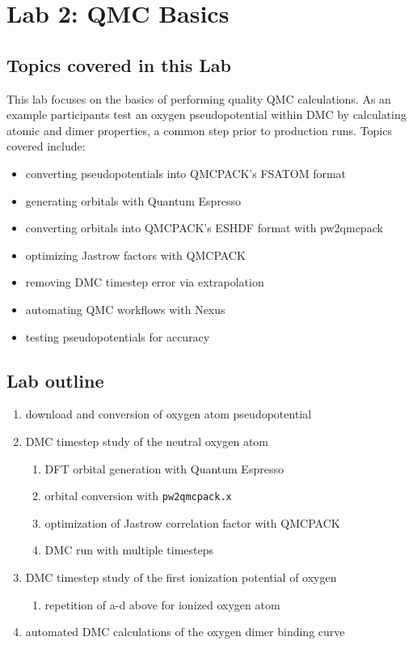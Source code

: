 \chapter{Lab 2: QMC Basics}
\label{chap:lab_qmc_basics}



\section{Topics covered in this Lab}
This lab focuses on the basics of performing quality QMC calculations.  As an example participants test an oxygen pseudopotential within DMC by calculating atomic and dimer properties, a common step prior to production runs.  Topics covered include:
\begin{itemize}
  \item{converting pseudopotentials into QMCPACK's FSATOM format}
  \item{generating orbitals with Quantum Espresso}
  \item{converting orbitals into QMCPACK's ESHDF format with pw2qmcpack}
  \item{optimizing Jastrow factors with QMCPACK}
  \item{removing DMC timestep error via extrapolation}
  \item{automating QMC workflows with Nexus}
  \item{testing pseudopotentials for accuracy}
\end{itemize}

\section{Lab outline}
\begin{enumerate}
  \item{download and conversion of oxygen atom pseudopotential}
  \item{DMC timestep study of the neutral oxygen atom}
  \begin{enumerate}
    \item{DFT orbital generation with Quantum Espresso}
    \item{orbital conversion with \texttt{pw2qmcpack.x}}
    \item{optimization of Jastrow correlation factor with QMCPACK}
    \item{DMC run with multiple timesteps}
  \end{enumerate}
  \item{DMC timestep study of the first ionization potential of oxygen}
  \begin{enumerate}
    \item{repetition of a-d above for ionized oxygen atom}
  \end{enumerate}
  \item{automated DMC calculations of the oxygen dimer binding curve}
\end{enumerate}


